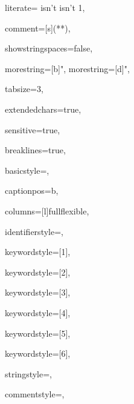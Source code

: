 {%
literate=
	{isn't }{{{\ttfamily\color{dkgreen} isn't }}}1,

comment=[s]{(*}{*)},

showstringspaces=false,

morestring=[b]",
morestring=[d]",

tabsize=3,

extendedchars=true,

sensitive=true,

breaklines=true,

basicstyle=\ttfamily,

captionpos=b,

columns=[l]fullflexible,

identifierstyle={\ttfamily\color{black}},

keywordstyle=[1]{\ttfamily\color{dkviolet}},

keywordstyle=[2]{\ttfamily\color{dkgreen}},

keywordstyle=[3]{\ttfamily\color{lightblue}},

keywordstyle=[4]{\ttfamily\color{dkblue}},

keywordstyle=[5]{\ttfamily\color{red}},


keywordstyle=[6]{\ttfamily\color{dkpink}},

stringstyle=\ttfamily,

commentstyle=\color{dk2green}\rmfamily,

}